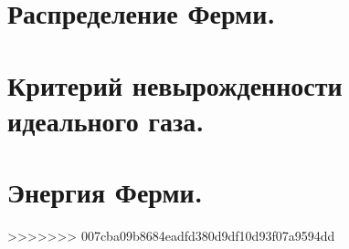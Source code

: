 \begin{multicols*}{2}
		\section{Распределение Ферми.}
		
		\section{Критерий невырожденности идеального газа.}
		
		\section{Энергия Ферми.}
		
>>>>>>> 007cba09b8684eadfd380d9df10d93f07a9594dd
	\end{multicols*}


